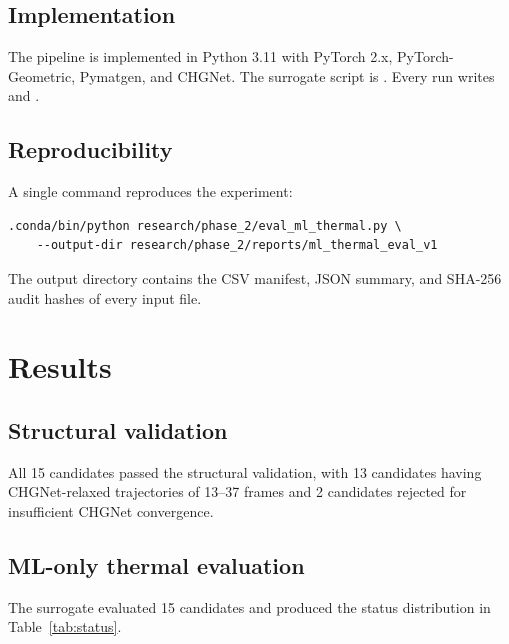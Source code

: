 \documentclass[11pt,a4paper]{article}
\begin{document}
\subsection{Implementation}
The pipeline is implemented in Python 3.11 with PyTorch 2.x,
PyTorch-Geometric, Pymatgen, and CHGNet. The surrogate script is
. Every run writes
 and
.

\subsection{Reproducibility}
A single command reproduces the experiment:
\begin{verbatim}
.conda/bin/python research/phase_2/eval_ml_thermal.py \
    --output-dir research/phase_2/reports/ml_thermal_eval_v1
\end{verbatim}
The output directory contains the CSV manifest, JSON summary, and
SHA-256 audit hashes of every input file.

\section{Results}
\label{sec:results}

\subsection{Structural validation}

All 15 candidates passed the structural validation, with 13 candidates
having CHGNet-relaxed trajectories of 13--37 frames and 2 candidates
rejected for insufficient CHGNet convergence.

\subsection{ML-only thermal evaluation}

The surrogate evaluated 15 candidates and produced the status
distribution in Table~\ref{tab:status}.
\end{document}
